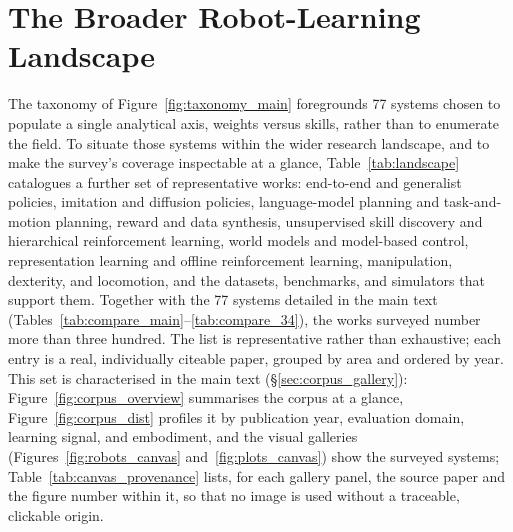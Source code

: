 \PassOptionsToPackage{svgnames,dvipsnames}{xcolor} \documentclass[acmsmall,screen,nonacm]{acmart}
\begin{document}



\clearpage
\appendix
\section{The Broader Robot-Learning Landscape}
\label{sec:landscape}

The taxonomy of Figure~\ref{fig:taxonomy_main} foregrounds 77 systems chosen to populate a single
analytical axis, weights versus skills, rather than to enumerate the field. To situate those systems
within the wider research landscape, and to make the survey's coverage inspectable at a glance,
Table~\ref{tab:landscape} catalogues a further set of representative works: end-to-end and generalist
policies, imitation and diffusion policies, language-model planning and task-and-motion planning,
reward and data synthesis, unsupervised skill discovery and hierarchical reinforcement learning, world
models and model-based control, representation learning and offline reinforcement learning,
manipulation, dexterity, and locomotion, and the datasets, benchmarks, and simulators that support
them. Together with the 77 systems detailed in the main text
(Tables~\ref{tab:compare_main}--\ref{tab:compare_34}), the works surveyed number more than three
hundred. The list is representative rather than exhaustive; each entry is a real, individually
citeable paper, grouped by area and ordered by year. This set is characterised in the main text
(\S\ref{sec:corpus_gallery}): Figure~\ref{fig:corpus_overview} summarises the corpus at a glance,
Figure~\ref{fig:corpus_dist} profiles it by publication year, evaluation domain, learning signal,
and embodiment, and the visual galleries (Figures~\ref{fig:robots_canvas} and~\ref{fig:plots_canvas})
show the surveyed systems; Table~\ref{tab:canvas_provenance} lists, for each gallery panel, the
source paper and the figure number within it, so that no image is used without a traceable,
clickable origin.
\end{document}
